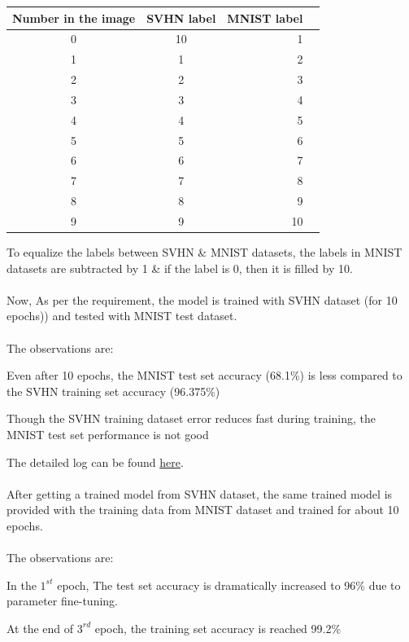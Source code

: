 \documentclass{article}
\begin{document}
	\begin{center}
	  \begin{tabular}{ c | c | r | l }
		\multicolumn{1}{c}{Number in the image} & 
		\multicolumn{1}{c}{SVHN label} & 
		\multicolumn{1}{c}{MNIST label}\\
	    \hline
	    0  & 10& 1 \\
	    1  & 1 & 2 \\
	    2  & 2 & 3 \\
	    3  & 3 & 4 \\
	    4  & 4 & 5 \\
	    5  & 5 & 6 \\
	    6  & 6 & 7 \\
	    7  & 7 & 8 \\ 
	    8  & 8 & 9 \\ 
	    9  & 9 & 10 \\
	    \hline
	  \end{tabular}
	\end{center}
	To equalize the labels between SVHN \& MNIST datasets, the labels in MNIST
	datasets are subtracted by 1 \& if the label is 0, then it is filled by
	10.\\\\Now, As per the requirement, the model is trained with SVHN dataset (for
	10 epochs)) and tested with MNIST test dataset.\\\\The observations are:
	\begin{list}{*}{}
	  \item Even after 10 epochs, the MNIST test set accuracy (68.1\%) is less
	  compared to the SVHN training set accuracy (96.375\%)
	  \item Though the SVHN training dataset error reduces fast during training,
	  the MNIST test set performance is not good
	\end{list}
	The detailed log can be found
	\href{./MNIST_test_with_SVHNmodel/results/SVHN_MNIST_trace.log}{here}.\\\\
	After getting a trained model from SVHN dataset, the same trained model is
	provided with the training data from MNIST dataset and trained for
	about 10 epochs.\\\\The observations are:
	\begin{list}{*}{}
	  \item In the $1^{st}$ epoch, The test set accuracy is dramatically increased
	  to 96\% due to parameter fine-tuning.
	  \item At the end of $3^{rd}$ epoch, the training set accuracy is reached
	  99.2\%
	\end{list}
\end{document}
